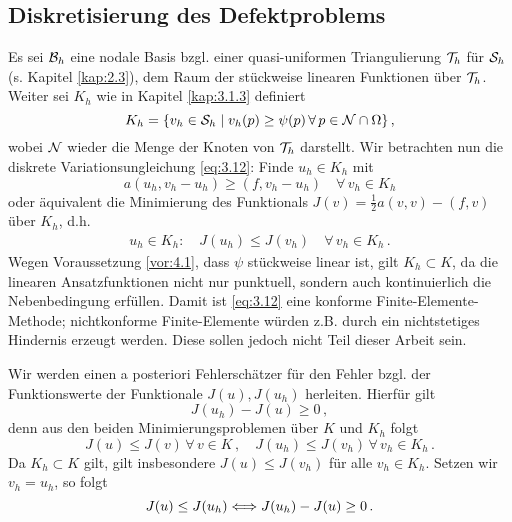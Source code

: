 \subsection{Diskretisierung des Defektproblems}
\label{kap:4.1.1}


Es sei $\mathcal B_h$ eine nodale Basis bzgl. einer quasi-uniformen Triangulierung $\mathcal T_h$  für $\mathcal S_h$ (s. Kapitel \ref{kap:2.3}), dem Raum der stückweise linearen Funktionen über $\mathcal T_h$. Weiter sei $K_h$ wie in Kapitel \ref{kap:3.1.3} definiert
\[
	K_h  = \{v_h \in \mathcal S_h \mid v_h (p) \ge \psi(p) \, \forall \, p \in \mathcal N \cap \Omega\} \, , 
\]
wobei $\mathcal N$ wieder die Menge der Knoten von $\mathcal T_h$ darstellt. Wir betrachten nun  die diskrete Variationsungleichung \eqref{eq:3.12}: Finde $u_h \in K_h$ mit
\[
	a(u_h,v_h-u_h) \ge (f,v_h-u_h) \quad \forall \, v_h \in K_h
\]
oder äquivalent die Minimierung des Funktionals $J(v) = \frac 1 2 a(v,v)-(f,v)$ über $K_h$, d.h.
\begin{align}\label{eq:4.1}
	u_h \in K_h :\quad J(u_h)\le J(v_h) \quad \forall \, v_h \in K_h \, .
\end{align}
Wegen  Voraussetzung \ref{vor:4.1}, dass $\psi$ stückweise linear ist, gilt $K_h \subset K$, da die linearen Ansatzfunktionen nicht nur punktuell, sondern auch kontinuierlich die Nebenbedingung erfüllen. Damit ist \eqref{eq:3.12} eine konforme Finite-Elemente-Methode; nichtkonforme Finite-Elemente würden z.B. durch ein nichtstetiges Hindernis erzeugt werden. Diese sollen jedoch nicht Teil dieser Arbeit sein.


Wir werden einen a posteriori Fehlerschätzer für den Fehler bzgl. der Funktionswerte der Funktionale $J(u),J(u_h)$ herleiten. Hierfür gilt
\[
	J(u_h) - J(u) \ge 0\, ,
\]
denn aus den beiden Minimierungsproblemen über $K$ und $K_h$ folgt
\[
	J(u) \le J(v) \, \forall \, v \in K \, , \quad J(u_h) \le J(v_h) \, \forall \, v_h \in K_h \, .
\]
Da $K_h \subset K$ gilt, gilt insbesondere $J(u)\le J(v_h)$ für alle $v_h \in K_h$. Setzen wir $v_h = u_h$, so folgt
\[
	J(u) \le J(u_h) \Longleftrightarrow J(u_h)-J(u) \ge 0 \, .
\]


